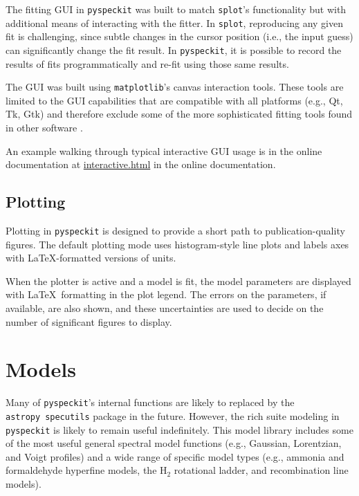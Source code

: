 \documentclass[twocolumn]{aastex62}
\newcommand{\pyspeckit}{\texttt{pyspeckit}\xspace}
\newcommand{\astropy}{\texttt{astropy}\xspace}
\newcommand{\hh}{\ensuremath{\mathrm{H}_2}\xspace}
\begin{document}
The fitting GUI in \texttt{pyspeckit} was built to match \texttt{splot}'s
functionality but with additional means of interacting with the fitter.  In
\texttt{splot}, reproducing any given fit is challenging, since subtle changes
in the cursor position (i.e., the input guess) can significantly change the fit
result.  In \pyspeckit, it is possible to record the results of fits
programmatically and re-fit using those same results.

The GUI was built using \texttt{matplotlib}'s canvas interaction tools.  These
tools are limited to the GUI capabilities that are compatible with all platforms
(e.g., Qt, Tk, Gtk) and therefore exclude some of the more sophisticated fitting
tools found in other software \citep[e.g., \texttt{glue};][]{Beaumont2014b}. 

An example walking through typical interactive GUI usage is in the online
documentation at \url{interactive.html} in the online documentation.

\subsection{Plotting}
Plotting in \pyspeckit is designed to provide a short path to
publication-quality figures.  The default plotting mode uses histogram-style
line plots and labels axes with \LaTeX-formatted versions of units.

When the plotter is active and a model is fit, the model parameters are
displayed with \LaTeX~formatting in the plot legend.  The errors on the
parameters, if available, are also shown, and these uncertainties are used to
decide on the number of significant figures to display.


\section{Models}
\label{sec:models}
Many of \pyspeckit's internal functions are likely to replaced by the \astropy\
\texttt{specutils} package in the future.  However, the rich suite modeling in
\pyspeckit is likely to remain useful indefinitely.  This model library
includes some of the most useful general spectral model functions (e.g.,
Gaussian, Lorentzian, and Voigt profiles) and a wide range of specific model
types (e.g., ammonia and formaldehyde hyperfine models, the \hh rotational
ladder, and recombination line models).
\end{document}
